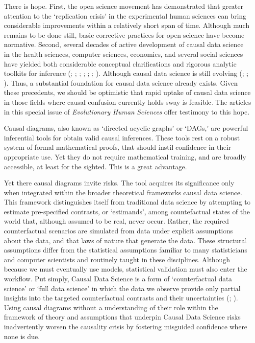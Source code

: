 \documentclass[
  singlecolumn,
  9pt]{article}
\begin{document}
There is hope. First, the open science movement has demonstrated that
greater attention to the `replication crisis' in the experimental human
sciences can bring considerable improvements within a relatively short
span of time. Although much remains to be done still, basic corrective
practices for open science have become normative. Second, several
decades of active development of causal data science in the health
sciences, computer sciences, economics, and several social sciences have
yielded both considerable conceptual clarifications and rigorous
analytic toolkits for inference (; ;
; ; ;
;
). Although causal data
science is still evolving (; ;
). Thus, a
substantial foundation for causal data science already exists. Given
these precedents, we should be optimistic that rapid uptake of causal
data science in those fields where causal confusion currently holds sway
is feasible. The articles in this special issue of \emph{Evolutionary
Human Sciences} offer testimony to this hope.

Causal diagrams, also known as `directed acyclic graphs' or `DAGs,' are
powerful inferential tools for obtain valid causal inferences. These
tools rest on a robust system of formal mathematical proofs, that should
instil confidence in their appropriate use. Yet they do not require
mathematical training, and are broadly accessible, at least for the
sighted. This is a great advantage.

Yet there causal diagrams invite risks. The tool acquires its
significance only when integrated within the broader theoretical
frameworks causal data science. This framework distinguishes itself from
traditional data science by attempting to estimate pre-specified
contrasts, or `estimands', among countefactual states of the world that,
although assumed to be real, never occur. Rather, the required
counterfactual scenarios are simulated from data under explicit
assumptions about the data, and that laws of nature that generate the
data. These structural assumptions differ from the statistical
assumptions familiar to many statisticians and computer scientists and
routinely taught in these disciplines. Although because we must
eventually use models, statistical validation must also enter the
workflow. Put simply, Causal Data Science is a form of `counterfactual
data science' or `full data science' in which the data we observe
provide only partial insights into the targeted counterfactual contrasts
and their uncertainties (;
). Using causal
diagrams without a understanding of their role within the framework of
theory and assumptions that underpin Causal Data Science risks
inadvertently worsen the causality crisis by fostering misguided
confidence where none is due.
\end{document}

